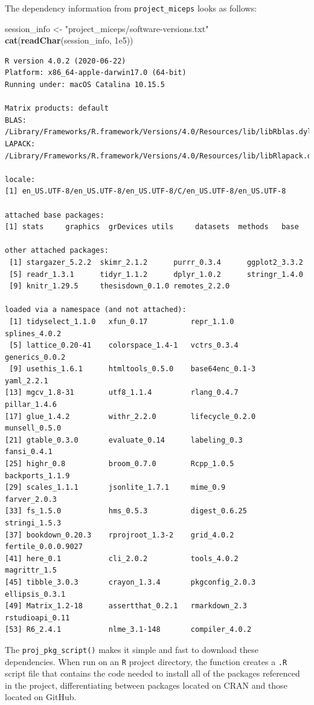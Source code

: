 \documentclass[12pt,twoside]{reedthesis}
\newenvironment{Shaded}{\begin{snugshade}}{\end{snugshade}}
\newcommand{\KeywordTok}[1]{\textcolor[rgb]{0.13,0.29,0.53}{\textbf{#1}}}
\newcommand{\FloatTok}[1]{\textcolor[rgb]{0.00,0.00,0.81}{#1}}
\newcommand{\StringTok}[1]{\textcolor[rgb]{0.31,0.60,0.02}{#1}}
\newcommand{\NormalTok}[1]{#1}
\begin{document}
The dependency information from \texttt{project\_miceps} looks as
follows:
\begin{Shaded}
\begin{Highlighting}[]
\NormalTok{session_info <-}\StringTok{ "project_miceps/software-versions.txt"}
\KeywordTok{cat}\NormalTok{(}\KeywordTok{readChar}\NormalTok{(session_info, }\FloatTok{1e5}\NormalTok{))}
\end{Highlighting}
\end{Shaded}
\begin{verbatim}
R version 4.0.2 (2020-06-22)
Platform: x86_64-apple-darwin17.0 (64-bit)
Running under: macOS Catalina 10.15.5

Matrix products: default
BLAS:   /Library/Frameworks/R.framework/Versions/4.0/Resources/lib/libRblas.dylib
LAPACK: /Library/Frameworks/R.framework/Versions/4.0/Resources/lib/libRlapack.dylib

locale:
[1] en_US.UTF-8/en_US.UTF-8/en_US.UTF-8/C/en_US.UTF-8/en_US.UTF-8

attached base packages:
[1] stats     graphics  grDevices utils     datasets  methods   base     

other attached packages:
 [1] stargazer_5.2.2  skimr_2.1.2      purrr_0.3.4      ggplot2_3.3.2   
 [5] readr_1.3.1      tidyr_1.1.2      dplyr_1.0.2      stringr_1.4.0   
 [9] knitr_1.29.5     thesisdown_0.1.0 remotes_2.2.0   

loaded via a namespace (and not attached):
 [1] tidyselect_1.1.0   xfun_0.17          repr_1.1.0         splines_4.0.2     
 [5] lattice_0.20-41    colorspace_1.4-1   vctrs_0.3.4        generics_0.0.2    
 [9] usethis_1.6.1      htmltools_0.5.0    base64enc_0.1-3    yaml_2.2.1        
[13] mgcv_1.8-31        utf8_1.1.4         rlang_0.4.7        pillar_1.4.6      
[17] glue_1.4.2         withr_2.2.0        lifecycle_0.2.0    munsell_0.5.0     
[21] gtable_0.3.0       evaluate_0.14      labeling_0.3       fansi_0.4.1       
[25] highr_0.8          broom_0.7.0        Rcpp_1.0.5         backports_1.1.9   
[29] scales_1.1.1       jsonlite_1.7.1     mime_0.9           farver_2.0.3      
[33] fs_1.5.0           hms_0.5.3          digest_0.6.25      stringi_1.5.3     
[37] bookdown_0.20.3    rprojroot_1.3-2    grid_4.0.2         fertile_0.0.0.9027
[41] here_0.1           cli_2.0.2          tools_4.0.2        magrittr_1.5      
[45] tibble_3.0.3       crayon_1.3.4       pkgconfig_2.0.3    ellipsis_0.3.1    
[49] Matrix_1.2-18      assertthat_0.2.1   rmarkdown_2.3      rstudioapi_0.11   
[53] R6_2.4.1           nlme_3.1-148       compiler_4.0.2    
\end{verbatim}
The \texttt{proj\_pkg\_script()} makes it simple and fast to download
these dependencies. When run on an \texttt{R} project directory, the
function creates a \texttt{.R} script file that contains the code needed
to install all of the packages referenced in the project,
differentiating between packages located on CRAN and those located on
GitHub.
\end{document}
